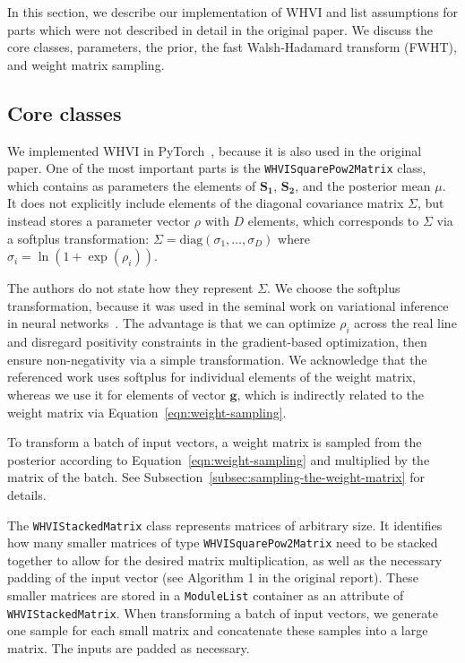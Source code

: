 In this section, we describe our implementation of WHVI and list assumptions for parts which were not described in detail in the original paper.
We discuss the core classes, parameters, the prior, the fast Walsh-Hadamard transform (FWHT), and weight matrix sampling.
\subsection{Core classes}\label{subsec:core-classes}
We implemented WHVI in PyTorch~\cite{pytorch}, because it is also used in the original paper.
One of the most important parts is the \texttt{WHVISquarePow2Matrix} class, which contains as parameters the elements of $\mathbf{S_1}$, $\mathbf{S_2}$, and the posterior mean $\mu$.
It does not explicitly include elements of the diagonal covariance matrix $\Sigma$, but instead stores a parameter vector $\rho$ with $D$ elements, which corresponds to $\Sigma$ via a softplus transformation: $\Sigma = \mathrm{diag}(\sigma_1, \dots, \sigma_D)$ where $\sigma_i = \ln(1 + \exp(\rho_i))$.

The authors do not state how they represent $\Sigma$.
We choose the softplus transformation, because it was used in the seminal work on variational inference in neural networks~\cite{blundell2015weight}.
The advantage is that we can optimize $\rho_i$ across the real line and disregard positivity constraints in the gradient-based optimization, then ensure non-negativity via a simple transformation.
We acknowledge that the referenced work uses softplus for individual elements of the weight matrix, whereas we use it for elements of vector $\mathbf{g}$, which is indirectly related to the weight matrix via Equation~\ref{eqn:weight-sampling}.

To transform a batch of input vectors, a weight matrix is sampled from the posterior according to Equation~\ref{eqn:weight-sampling} and multiplied by the matrix of the batch.
See Subsection~\ref{subsec:sampling-the-weight-matrix} for details.

The \texttt{WHVIStackedMatrix} class represents matrices of arbitrary size.
It identifies how many smaller matrices of type \texttt{WHVISquarePow2Matrix} need to be stacked together to allow for the desired matrix multiplication, as well as the necessary padding of the input vector (see Algorithm 1 in the original report).
These smaller matrices are stored in a \texttt{ModuleList} container as an attribute of \texttt{WHVIStackedMatrix}.
When transforming a batch of input vectors, we generate one sample for each small matrix and concatenate these samples into a large matrix.
The inputs are padded as necessary.

